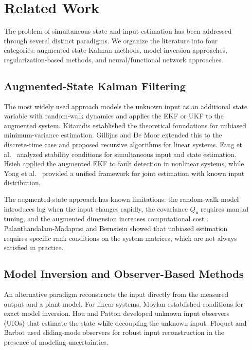 \documentclass[lettersize,journal]{IEEEtran}
\begin{document}
\section{Related Work}
\label{sec:related}

The problem of simultaneous state and input estimation has been addressed through several distinct paradigms. We organize the literature into four categories: augmented-state Kalman methods, model-inversion approaches, regularization-based methods, and neural/functional network approaches.

\subsection{Augmented-State Kalman Filtering}

The most widely used approach models the unknown input as an additional state variable with random-walk dynamics and applies the EKF or UKF to the augmented system. Kitanidis \cite{kitanidis1987} established the theoretical foundations for unbiased minimum-variance estimation. Gillijns and De Moor \cite{gillijns2007} extended this to the discrete-time case and proposed recursive algorithms for linear systems. Fang et al.\ \cite{fang2012} analyzed stability conditions for simultaneous input and state estimation. Hsieh \cite{hsieh2000} applied the augmented EKF to fault detection in nonlinear systems, while Yong et al.\ \cite{yong2016} provided a unified framework for joint estimation with known input distribution.

The augmented-state approach has known limitations: the random-walk model introduces lag when the input changes rapidly, the covariance $Q_u$ requires manual tuning, and the augmented dimension increases computational cost \cite{darouach1997}. Palanthandalam-Madapusi and Bernstein \cite{palanthandalam2007} showed that unbiased estimation requires specific rank conditions on the system matrices, which are not always satisfied in practice.

\subsection{Model Inversion and Observer-Based Methods}

An alternative paradigm reconstructs the input directly from the measured output and a plant model. For linear systems, Moylan \cite{moylan1977} established conditions for exact model inversion. Hou and Patton \cite{hou1998} developed unknown input observers (UIOs) that estimate the state while decoupling the unknown input. Floquet and Barbot \cite{floquet2007} used sliding-mode observers for robust input reconstruction in the presence of modeling uncertainties.
\end{document}
